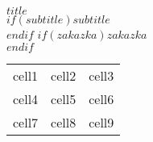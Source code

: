 
\pagestyle{fancy}
\fancyhf{} %

\begin{titlepage}
\begin{center}
{\large\bfseries{$title$}}\\[2\baselineskip]
$if(subtitle)${\large\textit{$subtitle$}}\\[4\baselineskip]$endif$
$if(zakazka)${\large\textit{$zakazka$}}\\[4\baselineskip]$endif$
\end{center}


\begin{tabular}{ c c c }
 cell1 & cell2 & cell3 \\
 cell4 & cell5 & cell6 \\
 cell7 & cell8 & cell9
\end{tabular}


\end{titlepage}
